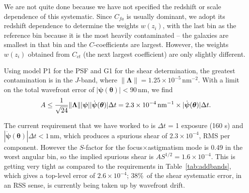 We are not quite done because we have not specified the redshift or scale dependence of this systematic. Since $C_{fa}$ is usually dominant, we adopt its redshift dependence to determine the weights $w(z_i)$, with the last bin as the reference bin because it is the most heavily contaminated -- the galaxies are smallest in that bin and the $C$-coefficients are largest. However, the weights $w(z_i)$ obtained from $C_{ct}$ (the next largest coefficient) are only slightly different. 

Using model P1 for the PSF and G1 for the shear determination, the greatest contamination is in the $J$-band, where $\lVert{\boldsymbol\Lambda}\rVert = 1.25\times 10^{-5}\,$nm$^{-2}$. With a limit on the total wavefront error of $|{\boldsymbol\psi}({\boldsymbol\theta})|<90\,$nm, we find
\begin{equation}
A \le \frac1{\sqrt{24}}\lVert{\boldsymbol\Lambda} \rVert |{\boldsymbol\psi}| |\dot{\boldsymbol\psi}({\boldsymbol\theta})| \Delta t
= 2.3\times 10^{-4}\, {\rm nm}^{-1}\times |\dot{\boldsymbol\psi}({\boldsymbol\theta})| \Delta t.
\end{equation}

The current requirement that we have worked to is $\Delta t$ = 1 exposure (160 s) and $|\dot{\boldsymbol\psi}({\boldsymbol\theta})| \Delta t<1\,$nm, which produces a spurious shear of $2.3\times 10^{-4}$, RMS per component. However the $S$-factor for the focus$\times$astigmatism mode is 0.49 in the worst angular bin, so the implied spurious shear is $AS^{1/2} = 1.6\times 10^{-4}$. This is getting very tight as compared to the requirements in Table~\ref{tab:addbands}, which gives a top-level error of $2.6\times 10^{-4}$; 38\%\ of the shear systematic error, in an RSS sense, is currently being taken up by wavefront drift.


